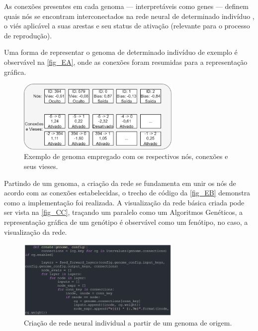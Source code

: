 As conexões presentes em cada genoma — interpretáveis como genes — definem quais nós se encontram interconectados na rede neural de determinado indivíduo
, o viés aplicável a suas arestas e seu status de ativação (relevante para o processo de reprodução).

Uma forma de representar o genoma de determinado indivíduo de exemplo é observável na \autoref{fig_EA}, onde as conexões foram resumidas para a representação gráfica.

\begin{figure}[htb]
        \centering
        \caption{\label{fig_EA}Exemplo de genoma empregado com os respectivos nós, conexões e seus vieses.}
        \includegraphics[width=0.7\textwidth]{images/EA.png}
\end{figure}

Partindo de um genoma, a criação da rede se fundamenta em unir os nós de acordo com as conexões estabelecidas,
o trecho de código da \autoref{fig_EB} demonstra como a implementação foi realizada. A visualização da rede básica
criada pode ser vista na \autoref{fig_CC}, traçando um paralelo como um Algoritmos Genéticos, a representação gráfica
de um genótipo é observável como um fenótipo, no caso, a visualização da rede.

\begin{figure}[htb]
        \centering
        \caption{\label{fig_EB}Criação de rede neural individual a partir de um genoma de origem.}
        \includegraphics[width=0.7\textwidth]{images/EB.png}
\end{figure}

